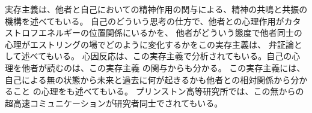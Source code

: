 \documentclass{jsarticle}
\begin{document}
     実存主義は、他者と自己においての精神作用の関与による、精神の共鳴と共振の機構を述べてもいる。
  自己のどういう思考の仕方で、他者との心理作用がカタストロフエネルギーの位置関係にいるかを、
  他者がどういう態度で他者同士の心理がエストリングの場でどのように変化するかをこの実存主義は、
  弁証論として述べてもいる。
  心因反応は、この実存主義で分析されてもいる。自己の心理を他者が読むのは、この実存主義
  の関与からも分かる。
  この実存主義には、自己による無の状態から未来と過去に何が起きるかも他者との相対関係から分かること
  の心理をも述べてもいる。
  プリンストン高等研究所では、この無からの超高速コミュニケーションが研究者同士でされてもいる。
\end{document}
